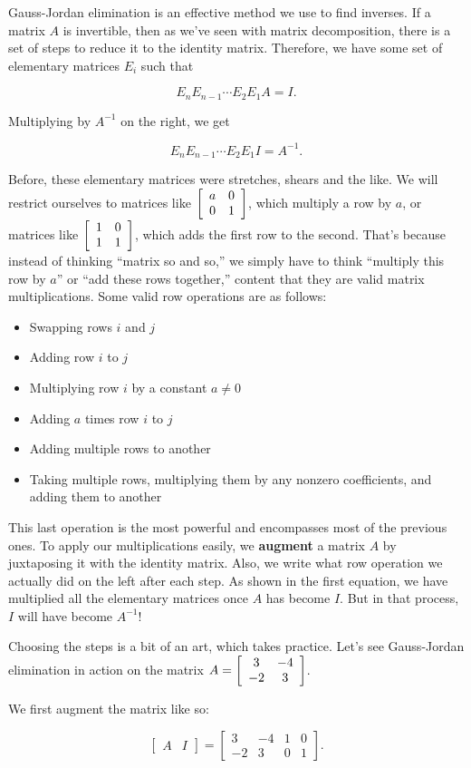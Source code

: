 \documentclass[../gatm.tex]{subfiles}
\begin{document}
Gauss-Jordan elimination is an effective method we use to find inverses. If a matrix $A$ is invertible, then as we've seen with matrix decomposition, there is a set of steps to reduce it to the identity matrix. Therefore, we have some set of elementary matrices $E_i$ such that

$$E_nE_{n-1}\cdots E_2E_1A=I.$$

Multiplying by $A^{-1}$ on the right, we get

$$E_nE_{n-1}\cdots E_2E_1I=A^{-1}.$$

Before, these elementary matrices were stretches, shears and the like. We will restrict ourselves to matrices like $\left[\begin{array}{cc} a & 0 \\ 0 & 1 \end{array}\right]$, which multiply a row by $a$, or matrices like $\left[\begin{array}{cc} 1 & 0 \\ 1 & 1 \end{array}\right]$, which adds the first row to the second. That's because instead of thinking ``matrix so and so,'' we simply have to think ``multiply this row by $a$'' or ``add these rows together,'' content that they are valid matrix multiplications. Some valid row operations are as follows:

\begin{itemize}
\item Swapping rows $i$ and $j$
\item Adding row $i$ to $j$
\item Multiplying row $i$ by a constant $a\neq 0$
\item Adding $a$ times row $i$ to $j$
\item Adding multiple rows to another
\item Taking multiple rows, multiplying them by any nonzero coefficients, and adding them to another
\end{itemize}

This last operation is the most powerful and encompasses most of the previous ones. To apply our multiplications easily, we \textbf{augment} a matrix $A$ by juxtaposing it with the identity matrix. Also, we write what row operation we actually did on the left after each step. As shown in the first equation, we have multiplied all the elementary matrices once $A$ has become $I$. But in that process, $I$ will have become $A^{-1}$!

Choosing the steps is a bit of an art, which takes practice. Let's see Gauss-Jordan elimination in action on the matrix $A=\left[\begin{array}{cc} 3 & -4 \\ -2 & 3 \end{array}\right]$.

We first augment the matrix like so:

$$\left[\begin{array}{c|c}A & I \end{array}\right] = \left[\begin{array}{cc|cc} 3 & -4 & 1 & 0 \\ -2 & 3 & 0 & 1 \end{array}\right].$$
\end{document}
